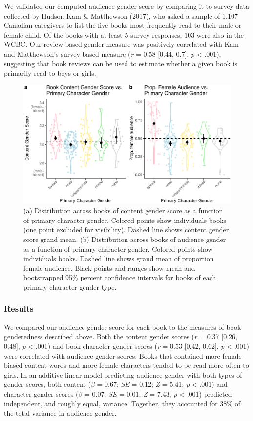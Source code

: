 \documentclass[
  english,
  ,man,floatsintext]{apa6}
\begin{document}
We validated our computed audience gender score by comparing it to survey data collected by Hudson Kam \& Matthewson (2017), who asked a sample of 1,107 Canadian caregivers to list the five books most frequently read to their male or female child. Of the books with at least 5 survey responses, 103 were also in the WCBC. Our review-based gender measure was positively correlated with Kam and Matthewson's survey based measure (\emph{r} = 0.58 {[}0.44, 0.7{]}, \emph{p} \textless{} .001), suggesting that book reviews can be used to estimate whether a given book is primarily read to boys or girls.

\begin{figure}[t!]
\includegraphics[width=\textwidth,]{kidbookgender_psych_sci_files/figure-latex/characterplots-1} \caption{(a) Distribution across books of content gender score as a function of primary character gender. Colored points show individuals books (one point excluded for visibility). Dashed line shows content gender score grand mean. (b) Distribution across books of audience gender as a function of primary character gender. Colored points show individuals books. Dashed line shows grand mean of proportion female audience. Black points and ranges show mean and bootstrapped 95\% percent confidence intervals for books of each primary character gender type.}\label{fig:characterplots}
\end{figure}

\hypertarget{results-1}{%
\subsubsection{Results}\label{results-1}}

We compared our audience gender score for each book to the measures of book genderedness described above. Both the content gender scores (\emph{r} = 0.37 {[}0.26, 0.48{]}, \emph{p} \textless{} .001) and book character gender scores (\emph{r} = 0.53 {[}0.42, 0.62{]}, \emph{p} \textless{} .001) were correlated with audience gender scores: Books that contained more female-biased content words and more female characters tended to be read more often to girls. In an additive linear model predicting audience gender with both types of gender scores, both content (\(\beta\) = 0.67; \emph{SE} = 0.12; \emph{Z} = 5.41; \emph{p} \textless{} .001) and character gender scores (\(\beta\) = 0.07; \emph{SE} = 0.01; \emph{Z} = 7.43; \emph{p} \textless{} .001) predicted independent, and roughly equal, variance. Together, they accounted for 38\% of the total variance in audience gender.
\end{document}
